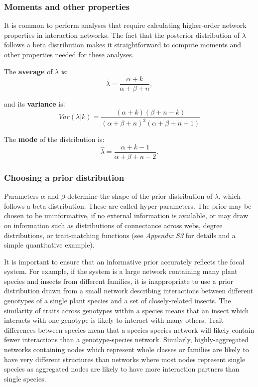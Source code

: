 \documentclass[12pt]{article}
\begin{document}
\begin{spacing}{2.0}
    \subsubsection*{Moments and other properties}

      It is common to perform analyses that require calculating higher-order network properties in interaction networks. The fact that the posterior distribution of $\lambda$ follows a beta distribution makes it straightforward to compute moments and other properties needed for these analyses. 


      The \textbf{average} of $\lambda$ is: 
          \begin{equation}
            \bar{\lambda} = \frac{\alpha+k}{\alpha+\beta+n} ,
            \label{mean}
          \end{equation}

        and its \textbf{variance} is:  
          \begin{equation}
            Var(\lambda|k) = \frac{(\alpha + k)(\beta + n - k)}{(\alpha + \beta + n)^{2}(\alpha + \beta + n +1)}
            \label{variance}
          \end{equation}

        The \textbf{mode} of the distribution is:
          \begin{equation}
            \hat{\lambda} = \frac{\alpha + k - 1}{\alpha + \beta + n - 2} .
            \label{mode}
          \end{equation}


    \subsubsection*{Choosing a prior distribution}    

      Parameters $\alpha$ and $\beta$ determine the shape of the prior distribution of $\lambda$, which follows a beta distribution. These are called hyper parameters. The prior may be chosen to be uninformative, if no external information is available, or may draw on information such as distributions of connectance across webs, degree distributions, or trait-matching functions (see \emph{Appendix S3} for details and a simple quantitative example). 


      It is important to ensure that an informative prior accurately reflects the focal  system. For example, if the system is a large network containing many plant species and insects from different families, it is inappropriate to use a prior distribution drawn from a small network describing interactions between different genotypes of a single plant species and a set of closely-related insects. The similarity of traits across genotypes within a species means that an insect which interacts with one genotype is likely to interact with many others. Trait differences between species mean that a species-species network will likely contain fewer interactions than a genotype-species network. Similarly, highly-aggregated networks containing nodes which represent whole classes or families are likely to have very different structures than networks where most nodes represent single species as aggregated nodes are likely to have more interaction partners than single species.



\end{spacing}
\end{document}
